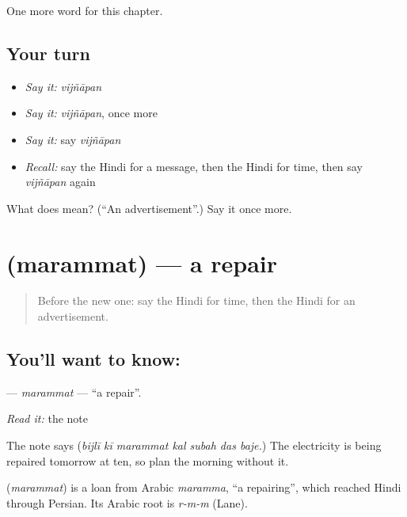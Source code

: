 \begin{grammarlens}[title={What you've built}]
One more word for this chapter.
\end{grammarlens}

\subsection*{Your turn}
\begin{itemize}
\raggedright
  \item \emph{Say it:} \emph{vijñāpan}
  \item \emph{Say it:} \emph{vijñāpan}, once more
  \item \emph{Say it:} say \emph{vijñāpan}
  \item \emph{Recall:} say the Hindi for a message, then the Hindi for time, then say \emph{vijñāpan} again
\end{itemize}

\begin{tcolorbox}[breakable,colback=teal!4,colframe=teal!35!black,title={Before you move on}]
What does  mean? (\textquotedblleft{}An advertisement\textquotedblright{}.) Say it once more.
\end{tcolorbox}
\section[\texorpdfstring{\hi{मरम्मत} (marammat)}{मरम्मत (marammat)}]{ (marammat) — a repair}

\label{lesson:HI-C166-marammat}



\begin{quote}
Before the new one: say the Hindi for time, then the Hindi for an advertisement.
\end{quote}

\subsection*{You'll want to know: }
\textbf{} — \emph{marammat} — \textquotedblleft{}a repair\textquotedblright{}.

\emph{Read it:} the note

The note says \textbf{      } (\emph{bijlī kī marammat kal subah das baje.}) The electricity is being repaired tomorrow at ten, so plan the morning without it.

\begin{cousinweb}
\textbf{} (\emph{marammat}) is a loan from Arabic \emph{maramma}, \textquotedblleft{}a repairing\textquotedblright{}, which reached Hindi through Persian. Its Arabic root is \emph{r-m-m} (Lane).
\end{cousinweb}

